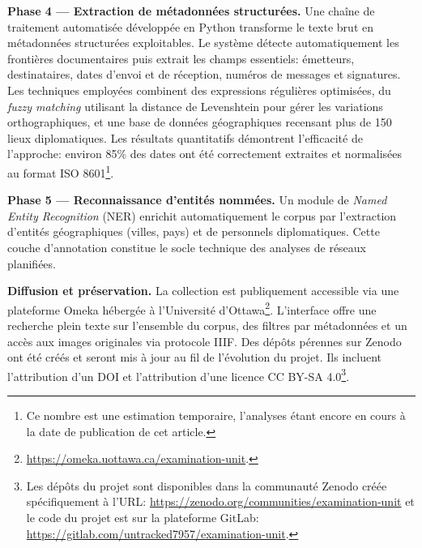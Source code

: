 \documentclass[final,fra]{anthology-ch}         %
\begin{document}
\textbf{Phase 4 --- Extraction de métadonnées structurées.} Une chaîne
de traitement automatisée développée en Python transforme le texte brut
en métadonnées structurées exploitables. Le système détecte
automatiquement les frontières documentaires puis extrait les champs
essentiels: émetteurs, destinataires, dates d'envoi et de réception,
numéros de messages et signatures. Les techniques employées combinent
des expressions régulières optimisées, du \emph{fuzzy matching}
utilisant la distance de Levenshtein pour gérer les variations
orthographiques, et une base de données géographiques recensant plus de
150 lieux diplomatiques. Les résultats quantitatifs démontrent
l'efficacité de l'approche: environ 85\% des dates ont été
correctement extraites et normalisées au format ISO 8601\footnote{Ce
  nombre est une estimation temporaire, l'analyses étant encore en cours
  à la date de publication de cet article.}.



\textbf{Phase 5 --- Reconnaissance d'entités nommées.} Un module de
\emph{Named Entity Recognition} (NER) enrichit automatiquement le corpus
par l'extraction d'entités géographiques (villes, pays) et de personnels
diplomatiques. Cette couche d'annotation constitue le socle technique
des analyses de réseaux planifiées.

\textbf{Diffusion et préservation.} La collection est publiquement
accessible via une plateforme Omeka hébergée à l'Université
d'Ottawa\footnote{\url{https://omeka.uottawa.ca/examination-unit}.}.
L'interface offre une recherche plein texte sur l'ensemble du corpus,
des filtres par métadonnées et un accès aux images originales via
protocole IIIF. Des dépôts pérennes sur Zenodo ont été créés et seront
mis à jour au fil de l'évolution du projet. Ils incluent l'attribution
d'un DOI et l'attribution d'une licence CC BY-SA 4.0\footnote{Les dépôts
  du projet sont disponibles dans la communauté Zenodo créée
  spécifiquement à l'URL:
  \url{https://zenodo.org/communities/examination-unit} et le code du
  projet est sur la plateforme GitLab:
  \url{https://gitlab.com/untracked7957/examination-unit}.}.
\end{document}
